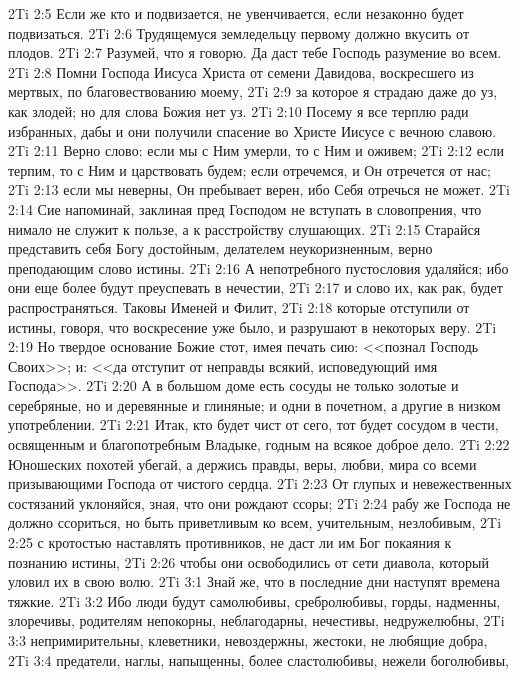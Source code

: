 \vs 2Ti 2:5 Если же кто и подвизается, не увенчивается, если незаконно будет подвизаться.
\vs 2Ti 2:6 Трудящемуся земледельцу первому должно вкусить от плодов.
\vs 2Ti 2:7 Разумей, что я говорю. Да даст тебе Господь разумение во всем.
\rsbpar\vs 2Ti 2:8 Помни Господа Иисуса Христа от семени Давидова, воскресшего из мертвых, по благовествованию моему,
\vs 2Ti 2:9 за которое я страдаю даже до уз, как злодей; но для слова Божия нет уз.
\vs 2Ti 2:10 Посему я все терплю ради избранных, дабы и они получили спасение во Христе Иисусе с вечною славою.
\vs 2Ti 2:11 Верно слово: если мы с Ним умерли, то с Ним и оживем;
\vs 2Ti 2:12 если терпим, то с Ним и царствовать будем; если отречемся, и Он отречется от нас;
\vs 2Ti 2:13 если мы неверны, Он пребывает верен, ибо Себя отречься не может.
\rsbpar\vs 2Ti 2:14 Сие напоминай, заклиная пред Господом не вступать в словопрения, что нимало не служит к пользе, а к расстройству слушающих.
\vs 2Ti 2:15 Старайся представить себя Богу достойным, делателем неукоризненным, верно преподающим слово истины.
\vs 2Ti 2:16 А непотребного пустословия удаляйся; ибо они еще более будут преуспевать в нечестии,
\vs 2Ti 2:17 и слово их, как рак, будет распространяться. Таковы Именей и Филит,
\vs 2Ti 2:18 которые отступили от истины, говоря, что воскресение уже было, и разрушают в некоторых веру.
\vs 2Ti 2:19 Но твердое основание Божие стот, имея печать сию: <<познал Господь Своих>>; и: <<да отступит от неправды всякий, исповедующий имя Господа>>.
\vs 2Ti 2:20 А в большом доме есть сосуды не только золотые и серебряные, но и деревянные и глиняные; и одни в почетном, а другие в низком употреблении.
\vs 2Ti 2:21 Итак, кто будет чист от сего, тот будет сосудом в чести, освященным и благопотребным Владыке, годным на всякое доброе дело.
\vs 2Ti 2:22 Юношеских похотей убегай, а держись правды, веры, любви, мира со всеми призывающими Господа от чистого сердца.
\vs 2Ti 2:23 От глупых и невежественных состязаний уклоняйся, зная, что они рождают ссоры;
\vs 2Ti 2:24 рабу же Господа не должно ссориться, но быть приветливым ко всем, учительным, незлобивым,
\vs 2Ti 2:25 с кротостью наставлять противников, не даст ли им Бог покаяния к познанию истины,
\vs 2Ti 2:26 чтобы они освободились от сети диавола, который уловил их в свою волю.
\vs 2Ti 3:1 Знай же, что в последние дни наступят времена тяжкие.
\vs 2Ti 3:2 Ибо люди будут самолюбивы, сребролюбивы, горды, надменны, злоречивы, родителям непокорны, неблагодарны, нечестивы, недружелюбны,
\vs 2Ti 3:3 непримирительны, клеветники, невоздержны, жестоки, не любящие добра,
\vs 2Ti 3:4 предатели, наглы, напыщенны, более сластолюбивы, нежели боголюбивы,
